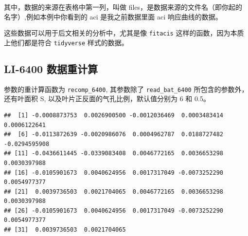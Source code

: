 \documentclass[
]{krantz}
\makeatletter
\newenvironment{Shaded}{\begin{snugshade}}{\end{snugshade}}
\newcommand{\AttributeTok}[1]{\textcolor[rgb]{0.77,0.63,0.00}{#1}}
\newcommand{\DecValTok}[1]{\textcolor[rgb]{0.00,0.00,0.81}{#1}}
\newcommand{\FloatTok}[1]{\textcolor[rgb]{0.00,0.00,0.81}{#1}}
\newcommand{\FunctionTok}[1]{\textcolor[rgb]{0.00,0.00,0.00}{#1}}
\newcommand{\NormalTok}[1]{#1}
\newcommand{\OtherTok}[1]{\textcolor[rgb]{0.56,0.35,0.01}{#1}}
\newcommand{\SpecialCharTok}[1]{\textcolor[rgb]{0.00,0.00,0.00}{#1}}
\newcommand{\StringTok}[1]{\textcolor[rgb]{0.31,0.60,0.02}{#1}}
\newenvironment{kframe}{%
\medskip{}
\setlength{\fboxsep}{.8em}
 \def\at@end@of@kframe{}%
 \ifinner\ifhmode%
  \def\at@end@of@kframe{\end{minipage}}%
  \begin{minipage}{\columnwidth}%
 \fi\fi%
 \def\FrameCommand##1{\hskip\@totalleftmargin \hskip-\fboxsep
 \colorbox{shadecolor}{##1}\hskip-\fboxsep
     \hskip-\linewidth \hskip-\@totalleftmargin \hskip\columnwidth}%
 \MakeFramed {\advance\hsize-\width
   \@totalleftmargin\z@ \linewidth\hsize
   \@setminipage}}%
 {\par\unskip\endMakeFramed%
 \at@end@of@kframe}
\renewenvironment{Shaded}{\begin{kframe}}{\end{kframe}}
\makeatother
\begin{document}
其中，数据的来源在表格中第一列，叫做 files，是数据来源的文件名（即你起的名字）,例如本例中你看到的 aci 是我之前数据里面 aci 响应曲线的数据。

这些数据可以用于后文相关的分析中，尤其是像 \texttt{fitacis} 这样的函数，因为本质上他们都是符合 \texttt{tidyverse} 样式的数据。

\hypertarget{recompute6400}{%
\subsection{LI-6400 数据重计算}\label{recompute6400}}

参数的重计算函数为 \texttt{recomp\_6400}, 其参数除了 \texttt{read\_bat\_6400} 所包含的参数外，还有叶面积 S, 以及叶片正反面的气孔比例，默认值分别为 6 和 0.5。

\begin{Shaded}
\end{Shaded}

\begin{verbatim}
##  [1] -0.0008873753  0.0026900500 -0.0012036469  0.0003483414  0.0006122641
##  [6] -0.0113872639 -0.0020986076  0.0004962787  0.0188727482 -0.0294595908
## [11] -0.0436611445 -0.0339083408  0.0046772165  0.0036653298  0.0030397988
## [16] -0.0105901673  0.0040624956  0.0017317049 -0.0073252290  0.0054977377
## [21]  0.0039736503  0.0021704065  0.0046772165  0.0036653298  0.0030397988
## [26] -0.0105901673  0.0040624956  0.0017317049 -0.0073252290  0.0054977377
## [31]  0.0039736503  0.0021704065
\end{verbatim}

\begin{Shaded}
\end{Shaded}
\end{document}
